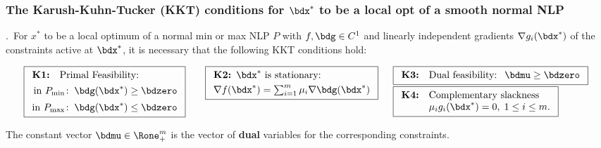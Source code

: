 \documentclass[a4paper]{article}
\begin{document}

 \subsubsection*{The Karush-Kuhn-Tucker (KKT) conditions for $\bdx^*$ to be a local opt of a smooth normal NLP}%


    \medskip
    \Thm.~For $x^*$ to be a local optimum of a normal min or max NLP $P$
    with $f,\bdg\in C^1$ and linearly independent gradients $\nabla g_i(\bdx^*)$
    of the constraints active at $\bdx^*$, it is necessary that the following
    KKT conditions hold:

    \[
        \boxed{
        \begin{array}[t]{rl}
        \textbf{K1:}
        & \text{Primal Feasibility:} \\[4pt]
        \multicolumn{2}{r}{\text{in}~P_{\min}\!:\; \bdg(\bdx^*)\ge\bdzero} \\[5pt]
        \multicolumn{2}{r}{\text{in}~P_{\max}\!:\; \bdg(\bdx^*)\le\bdzero} \\
        \end{array}}
        \hspace{2em}
        \boxed{
        \begin{array}[t]{l}
        \textbf{K2: }
        \bdx^*~\text{is stationary:} \\[3pt]
         \nabla f(\bdx^*)=\sum_{i=1}^m\mu_i\nabla\bdg(\bdx^*) \\
        \end{array}}
        \hspace{1em}
        \begin{array}[t]{l}
          \boxed{
            \begin{array}[t]{rl}
              \textbf{K3:} & \text{Dual feasibility: }~\bdmu \ge \bdzero
          \end{array}}
          \\[5pt]
          \boxed{
            \begin{array}[t]{rl}
              \textbf{K4:}&\text{Complementary slackness} \\
                          &\mu_ig_i(\bdx^*) = 0,\; 1\le i\le m.
          \end{array}}
        \end{array}
    \]

    The constant vector $\bdmu\in\Rone^m_+$ is the vector of \textbf{dual} variables for the
    corresponding constraints.
\end{document}
